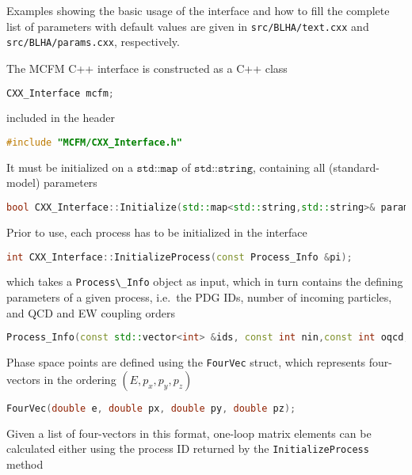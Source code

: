 Examples showing the basic usage of the interface and how to fill the
complete list of parameters with default values are given in
{\lstinline!src/BLHA/text.cxx!} and
{\lstinline!src/BLHA/params.cxx!}, respectively.

The MCFM C++ interface is constructed as a C++ class

\begin{lstlisting}[language={C++}]
CXX_Interface mcfm;
\end{lstlisting}

included in the header

\begin{lstlisting}[language={C++}]
#include "MCFM/CXX_Interface.h"
\end{lstlisting}

It must be initialized on a \(\texttt{std::map}\) of
\(\texttt{std::string}\), containing all (standard-model) parameters

\begin{lstlisting}[language={C++}]
bool CXX_Interface::Initialize(std::map<std::string,std::string>& parameters);
\end{lstlisting}

Prior to use, each process has to be initialized in the interface

\begin{lstlisting}[language={C++}]
int CXX_Interface::InitializeProcess(const Process_Info &pi);
\end{lstlisting}

which takes a {\lstinline!Process\_Info!} object as input,
which in turn contains the defining parameters of a given process,
i.e.~the PDG IDs, number of incoming particles, and QCD and EW coupling
orders

\begin{lstlisting}[language={C++}]
Process_Info(const std::vector<int> &ids, const int nin,const int oqcd, const int oew);
\end{lstlisting}

Phase space points are defined using the
{\lstinline!FourVec!} struct, which represents four-vectors
in the ordering \((E, p_x, p_y, p_z)\)

\begin{lstlisting}[language={C++}]
FourVec(double e, double px, double py, double pz);
\end{lstlisting}

Given a list of four-vectors in this format, one-loop matrix elements
can be calculated either using the process ID returned by the
{\lstinline!InitializeProcess!} method

